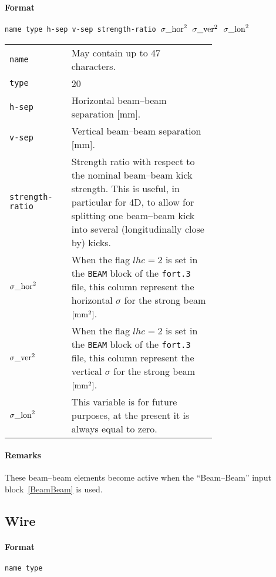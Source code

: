 \paragraph{Format} \texttt{name type h-sep v-sep strength-ratio ${\sigma\_\rm{hor}}^2$ ${\sigma\_\rm{ver}}^2$ ${\sigma\_\rm{lon}}^2$}

\bigskip
\begin{longtabu}{@{}lp{0.7\linewidth}}
    \texttt{name}  & May contain up to 47 characters. \\
    \texttt{type}  & 20 \\
    \texttt{h-sep} & Horizontal beam--beam separation [mm]. \\
    \texttt{v-sep} & Vertical beam--beam separation [mm]. \\
    \texttt{strength-ratio} & Strength ratio with respect to the nominal beam--beam kick strength. This is useful, in particular for 4D, to allow for splitting one beam--beam kick into several (longitudinally close by) kicks. \\
    \texttt{${\sigma\_\rm{hor}}^2$} & When the flag $lhc=2$ is set in the \texttt{BEAM} block of the \texttt{fort.3} file, this column represent the horizontal $\sigma$ for the strong beam $\rm{[mm^2]}$. \\
    \texttt{${\sigma\_\rm{ver}}^2$} & When the flag $lhc=2$ is set in the \texttt{BEAM} block of the \texttt{fort.3} file, this column represent the vertical $\sigma$ for the strong beam $\rm{[mm^2]}$. \\
    \texttt{${\sigma\_\rm{lon}}^2$} & This variable is for future purposes, at the present it is always equal to zero.
\end{longtabu}

\paragraph{Remarks}
These beam--beam elements become active when the ``Beam--Beam'' input block~\ref{BeamBeam} is used.

\subsection{Wire} \label{WIRE}

\paragraph{Format} \texttt{name type}

